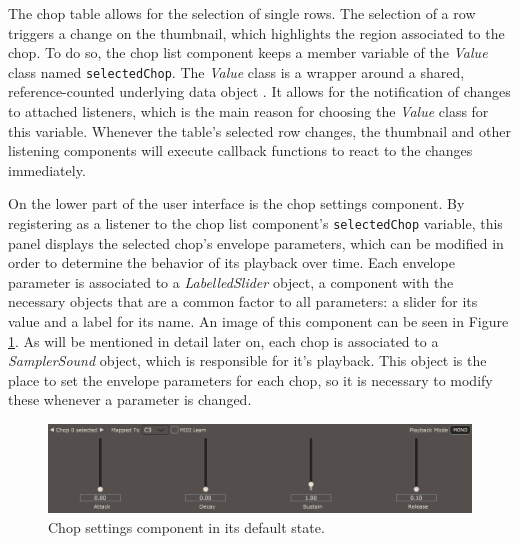 \documentclass[12pt, a4paper, hidelinks]{report}
\begin{document}
	The chop table allows for the selection of single rows. The selection of a row triggers a change on the thumbnail, which highlights the region associated to the chop. To do so, the chop list component keeps a member variable of the \textit{Value} class named \texttt{selectedChop}. The \textit{Value} class is a wrapper around a shared, reference-counted underlying data object \cite{value}. It allows for the notification of changes to attached listeners, which is the main reason for choosing the \textit{Value} class for this variable. Whenever the table's selected row changes, the thumbnail and other listening components will execute callback functions to react to the changes immediately. \par

	On the lower part of the user interface is the chop settings component. By registering as a listener to the chop list component's \texttt{selectedChop} variable, this panel displays the selected chop's envelope parameters, which can be modified in order to determine the behavior of its playback over time. Each envelope parameter is associated to a \textit{LabelledSlider} object, a component with the necessary objects that are a common factor to all parameters: a slider for its value and a label for its name. An image of this component can be seen in Figure \ref{fig:chset}. As will be mentioned in detail later on, each chop is associated to a \textit{SamplerSound} object, which is responsible for it's playback. This object is the place to set the envelope parameters for each chop, so it is necessary to modify these whenever a parameter is changed. \par
	
	\begin{figure}[h!]
		\centering
		\includegraphics[width=\textwidth]{u/chopsettings.png}
		\caption{Chop settings component in its default state.}
		\label{fig:chset}
	\end{figure}	
\end{document}
